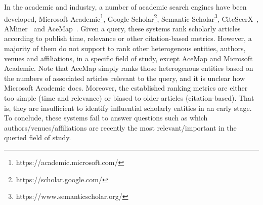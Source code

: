 In the academic and industry, a number of academic search engines have been developed, \eg Microsoft Academic\footnote{https://academic.microsoft.com/}, Google Scholar\footnote{https://scholar.google.com/}, Semantic Scholar\footnote{https://www.semanticscholar.org/}, CiteSeerX~\cite{li2006citeseerx}, AMiner~\cite{tang2008arnetminer} and AceMap~\cite{tan2016acemap}.
%
Given a query, these systems rank scholarly articles according to publish time, relevance or other citation-based metrics. %
%
However, a majority of them do not support to rank other heterogenous entities, \eg authors, venues and affiliations, in a specific field of study, except AceMap and Microsoft Academic. Note that AceMap simply ranks those heterogenous entities  based on the numbers of associated articles relevant to the query, and it is unclear how Microsoft Academic does. Moreover, the established ranking metrics are either too simple (\eg time and relevance) or biased to older articles (\eg citation-based). That is, they are insufficient to identify influential scholarly entities in an early stage.
%
To conclude, these systems fail to answer questions such as which authors/venues/affiliations are recently the most relevant/important in the queried field of study.




